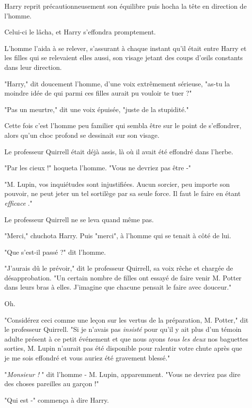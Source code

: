 Harry reprit précautionneusement son équilibre puis hocha la tête en direction de l'homme.

Celui-ci le lâcha, et Harry s'effondra promptement.

L'homme l'aida à se relever, s'assurant à chaque instant qu'il était entre Harry et les filles qui se relevaient elles aussi, son visage jetant des coups d'œils constants dans leur direction.

"Harry," dit doucement l'homme, d'une voix extrêmement sérieuse, "as-tu la moindre idée de qui parmi ces filles aurait pu vouloir te tuer ?"

"Pas un meurtre," dit une voix épuisée, "juste de la stupidité."

Cette fois c'est l'homme peu familier qui sembla être sur le point de s'effondrer, alors qu'un choc profond se dessinait sur son visage.

Le professeur Quirrell était déjà assis, là où il avait été effondré dans l'herbe.

"Par les cieux !" hoqueta l'homme. "Vous ne devriez pas être -"

"M. Lupin, vos inquiétudes sont injustifiées. Aucun sorcier, peu importe son pouvoir, ne peut jeter un tel sortilège par sa seule force. Il faut le faire en étant \emph{efficace} ."

Le professeur Quirrell ne se leva quand même pas.

"Merci," chuchota Harry. Puis "merci", à l'homme qui se tenait à côté de lui.

"Que s'est-il passé ?" dit l'homme.

"J'aurais dû le prévoir," dit le professeur Quirrell, sa voix rêche et chargée de désapprobation. "Un certain nombre de filles ont essayé de faire venir M. Potter dans leurs bras à elles. J'imagine que chacune pensait le faire avec douceur."

Oh.

"Considérez ceci comme une leçon sur les vertus de la préparation, M. Potter," dit le professeur Quirrell. "Si je n'avais pas \emph{insisté}  pour qu'il y ait plus d'un témoin adulte présent à ce petit événement et que nous ayons \emph{tous les deux}  nos baguettes sorties, M. Lupin n'aurait pas été disponible pour ralentir votre chute après que je me sois effondré et vous auriez été gravement blessé."

"\emph{Monsieur !} " dit l'homme - M. Lupin, apparemment. "Vous ne devriez pas dire des choses pareilles au garçon !"

"Qui est -" commença à dire Harry.

